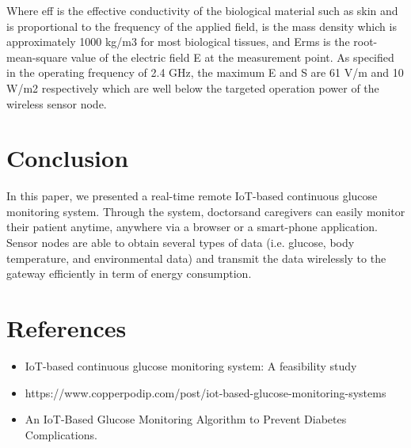 \documentclass{article}
\begin{document}
Where eff is the effective conductivity of the biological material such as skin and is proportional to the frequency of the applied field, is the mass density which is approximately 1000 kg/m3 for most biological tissues, and Erms is the root-mean-square value of the electric field E at the measurement point. As specified in the operating frequency of 2.4 GHz, the maximum E and S are 61 V/m and 10 W/m2 respectively which are well below the targeted operation power of the wireless sensor node.   

\section{Conclusion}
In this paper, we presented a real-time remote IoT-based continuous glucose monitoring system. Through the system, doctorsand caregivers can easily monitor their patient anytime, anywhere via a browser or a smart-phone application. Sensor nodes are able to obtain several types of data (i.e. glucose, body temperature, and environmental data) and transmit the data wirelessly to the gateway efficiently in term of energy consumption.

\section{References}
\begin{itemize}
\item IoT-based continuous glucose monitoring system: A feasibility study
\item https://www.copperpodip.com/post/iot-based-glucose-monitoring-systems
\item An IoT-Based Glucose Monitoring Algorithm to
Prevent Diabetes Complications.
\end{itemize}
\end{document}
